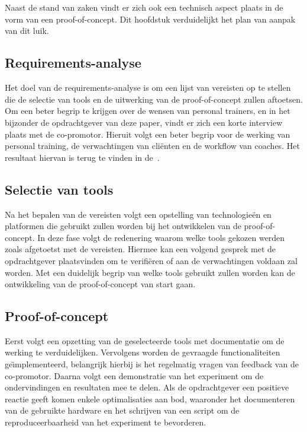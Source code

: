 
\chapter{}
\label{ch:methodologie}
Naast de stand van zaken vindt er zich ook een technisch aspect plaats in de vorm van een proof-of-concept.
Dit hoofdstuk verduidelijkt het plan van aanpak van dit luik.

\section{Requirements-analyse}
\label{sec:requirementsanalyse}
Het doel van de requirements-analyse is om een lijst van vereisten op te stellen die de selectie van tools en de uitwerking van de proof-of-concept zullen aftoetsen.
Om een beter begrip te krijgen over de wensen van personal trainers, en in het bijzonder de opdrachtgever van deze paper, vindt er zich een korte interview plaats met de co-promotor.
Hieruit volgt een beter begrip voor de werking van personal training, de verwachtingen van cli\"enten en de workflow van coaches.
Het resultaat hiervan is terug te vinden in de~.

\section{Selectie van tools}
\label{sec:selectie-van-tools}
Na het bepalen van de vereisten volgt een opstelling van technologie\"en en platformen die gebruikt zullen worden bij het ontwikkelen van de proof-of-concept.
In deze fase volgt de redenering waarom welke tools gekozen werden zoals afgetoetst met de vereisten.
Hiermee kan een volgend gesprek met de opdrachtgever plaatsvinden om te verifi\"eren of aan de verwachtingen voldaan zal worden.
Met een duidelijk begrip van welke tools gebruikt zullen worden kan de ontwikkeling van de proof-of-concept van start gaan.

\section{Proof-of-concept}
\label{sec:proof-of-concept2}
Eerst volgt een opzetting van de geselecteerde tools met documentatie om de werking te verduidelijken.
Vervolgens worden de gevraagde functionaliteiten ge\"{\i}mplementeerd, belangrijk hierbij is het regelmatig vragen van feedback van de co-promotor.
Daarna volgt een demonstratie van het experiment om de ondervindingen en resultaten mee te delen.
Als de opdrachtgever een positieve reactie geeft komen enkele optimalisaties aan bod, waaronder het documenteren van de gebruikte hardware en het schrijven van een script om de reproduceerbaarheid van het experiment te bevorderen.

